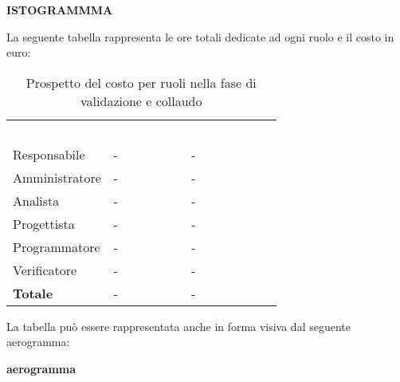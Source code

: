\textbf{ISTOGRAMMMA}


La seguente tabella rappresenta le ore totali dedicate ad ogni ruolo e il costo in euro:

\begin{table}[!htbp]
\begin{center}
\renewcommand{\arraystretch}{1.5}
\begin{tabular}{ m{}<{\centering}  m{}<{\centering} m{}<{\centering}}
	\rowcolor{darkblue}
	\textcolor{white}{\textbf{Ruolo}}&\textcolor{white}{\textbf{Totale ore}}&\textcolor{white}{\textbf{Costo totale}}\\ 

	Responsabile  & - & - \\	

	\rowcolor{gray!10} Amministratore & - & - \\
	
	Analista & - & - \\
	
	\rowcolor{gray!10} Progettista & - & - \\
	
	Programmatore & - & - \\
	
	\rowcolor{gray!10} Verificatore & - & - \\
	
	\textbf{Totale} & - & - \\
	
\end{tabular}
\caption{Prospetto del costo per ruoli nella fase di validazione e collaudo}
\end{center}
\end{table}

La tabella può essere rappresentata anche in forma visiva dal seguente aerogramma:

\textbf{aerogramma}









